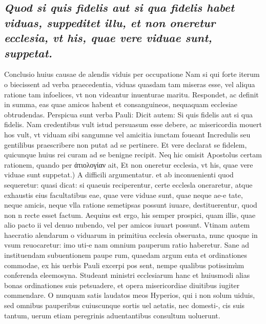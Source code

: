 \documentclass{article}
\begin{document}
\begin{pages}
\subsection*{\textit{Quod si quis fidelis aut si qua fidelis habet viduas, suppeditet illu, et non oneretur ecclesia, vt his, quae vere viduae sunt, suppetat. }}\pstart Conclusio huius causae de alendis viduis per occupatione Nam si qui forte iterum o biecissent ad verba praecedentia, viduas quasdam tam miseras esse, vel aliqua ratione tam infoelices, vt non videantur inuenturae maritu. Respondet, ac definit in summa, eas quae amicos habent et consanguineos, nequaquam ecclesiae obtrudendas. Perspicua sunt verba Pauli: Dicit autem: Si quis fidelis aut si qua fidelis. Nam credentibus vult istud persuasum esse debere, ac misericordia mouert hos vult, vt viduam sibi sangumne vel amicitia iunctam foueant Incredulis seu gentilibus praescribere non putat ad se pertinere. Et vere declarat se fidelem, quicunque huius rei curam ad se benigne recipit. Neq hic omisit Apostolus certam rationem, quando per ἀτιολογίαν ait,  \pend\pstart Et non oneretur ecclesia, vt his, quae vere viduae sunt suppetat.) A difficili argumentatur. et ab inconuenienti quod sequeretur: quasi dicat: si quaeuis reciperentur, certe ecclesla oneraretur, atque exhaustis eius facultatibus eae, quae vere viduae sunt, quae neque ae-e tate, neque amicis, neque vlla ratione semetipsas possunt iuuare, destituerentur, quod non n recte esset factum. Aequius est ergo, his semper prospici, quam illis, quae alio pacto ii vel denuo nubendo, vel per amicos iuuart possunt. Vtinam autem haecratio alendarum o viduarum in primitiua ecclesia obseruata, nunc quoque in vsum reuocaretur: imo uti-e nam omnium pauperum ratio haberetur. Sane ad instituendam subuentionem paupe rum, quaedam argum enta et ordinationes commodae, ex his uerbis Pauli excerpi pos sent, nempe qualibus potissimùm conferenda eleemosyna. Studeant ministri ecclesiarum hanc et huiusmodi alias bonas ordinationes suis petsuadere, et opera misericordiae diuitibus iugiter commendare. O nunquam satis laudatos meos Hyperios, qui i non solum uiduis, sed omnibus pauperibus cuiuscunque sortis uel aetatis, nec domesti-, cis suis tantum, uerum etiam peregrinis aduentantibus consultum uoluerunt.  \pend
{}
{}

\end{pages}
\end{document}

